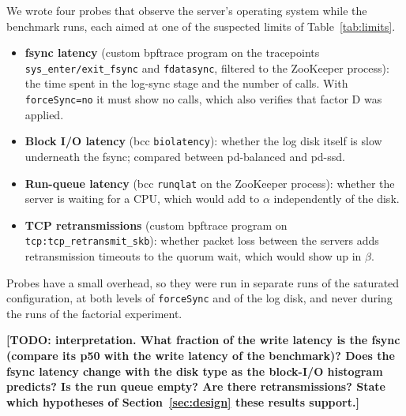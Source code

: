 We wrote four probes that observe the server's operating system while the benchmark runs, each aimed at one of the
suspected limits of Table~\ref{tab:limits}.
\begin{itemize}
  \item \textbf{fsync latency} (custom bpftrace program on the tracepoints \texttt{sys\_enter/exit\_fsync} and
    \texttt{fdatasync}, filtered to the ZooKeeper process): the time spent in the log-sync stage and the number of
    calls. With \texttt{forceSync=no} it must show no calls, which also verifies that factor D was applied.
  \item \textbf{Block I/O latency} (bcc \texttt{biolatency}): whether the log disk itself is slow underneath the
    fsync; compared between pd-balanced and pd-ssd.
  \item \textbf{Run-queue latency} (bcc \texttt{runqlat} on the ZooKeeper process): whether the server is waiting
    for a CPU, which would add to $\alpha$ independently of the disk.
  \item \textbf{TCP retransmissions} (custom bpftrace program on \texttt{tcp:tcp\_retransmit\_skb}): whether packet loss
    between the servers adds retransmission timeouts to the quorum wait, which would show up in $\beta$.
\end{itemize}
Probes have a small overhead, so they were run in separate runs of the saturated configuration, at both levels of
\texttt{forceSync} and of the log disk, and never during the runs of the factorial experiment.

\begin{table}[h]
  \centering
  \caption{eBPF measurements on the leader during a 40\,s saturated run; percentiles are upper bounds of
    histogram buckets.}
  \label{tab:ebpf}
  \footnotesize
\end{table}

\textbf{[TODO: interpretation. What fraction of the write latency is the fsync (compare its p50 with the write latency
of the benchmark)? Does the fsync latency change with the disk type as the block-I/O histogram predicts? Is the
run queue empty? Are there retransmissions? State which hypotheses of Section~\ref{sec:design} these results
support.]}
